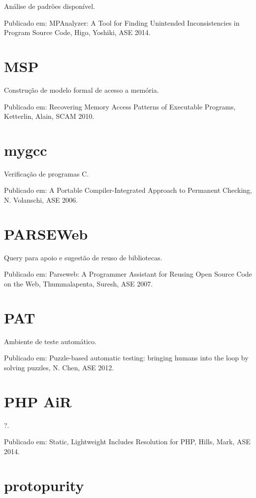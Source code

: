 Análise de padrões disponível.

Publicado em: MPAnalyzer: A Tool for Finding Unintended Inconsistencies in Program Source Code,
Higo, Yoshiki,
ASE
2014.

\section{MSP}

Construção de modelo formal de acesso a memória.

Publicado em: Recovering Memory Access Patterns of Executable Programs,
Ketterlin, Alain,
SCAM
2010.

\section{mygcc}

Verificação de programas C.

Publicado em: A Portable Compiler-Integrated Approach to Permanent Checking,
N. Volanschi,
ASE
2006.

\section{PARSEWeb}

Query para apoio e sugestão de reuso de bibliotecas.

Publicado em: Parseweb: A Programmer Assistant for Reusing Open Source Code on the Web,
Thummalapenta, Suresh,
ASE
2007.

\section{PAT}

Ambiente de teste automático.

Publicado em: Puzzle-based automatic testing: bringing humans into the loop by solving puzzles,
N. Chen,
ASE
2012.

\section{PHP AiR}

?.

Publicado em: Static, Lightweight Includes Resolution for PHP,
Hills, Mark,
ASE
2014.

\section{protopurity}

